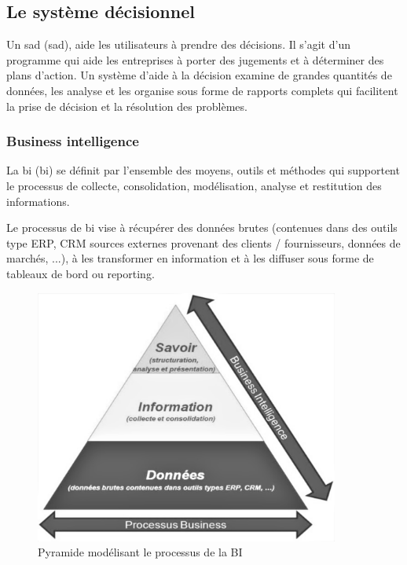         \subsection[Le système décisionnel]{Le système décisionnel}
        Un \acrlong{sad} (\acrshort{sad}), aide les utilisateurs à prendre des décisions.
        Il s’agit d’un programme qui aide les entreprises à porter des jugements
        et à déterminer des plans d’action.
        Un système d’aide à la décision examine
        de grandes quantités de données, les analyse et les organise sous forme
        de rapports complets qui facilitent la prise de décision et
        la résolution des problèmes. \cite*{SAD}
            \subsubsection[Business intelligence]{Business intelligence}
            La \acrlong{bi} (\acrshort{bi}) se définit par l'ensemble des moyens,
            outils et méthodes qui supportent le processus de collecte, consolidation,
            modélisation, analyse et restitution des informations.
            \par
            Le processus de \acrshort{bi} vise à récupérer des données brutes
            (contenues dans des outils type ERP, CRM sources externes provenant
            des clients / fournisseurs, données de marchés, ...), à les transformer
            en information et à les diffuser sous forme de tableaux
            de bord ou reporting.
            \par
            \begin{figure}[h]
                \centering
                \includegraphics[width=100mm]{images/bi-image.jpg}
                \caption{ Pyramide modélisant le processus de la BI}
                \label{fig:pyramideBi}
            \end{figure}
